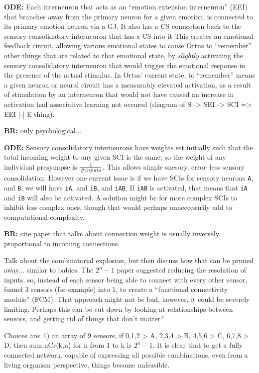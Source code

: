 \documentclass[letterpaper]{article}
\begin{document}
\textbf{ODE:} Each interneuron that acts as an ``emotion extension interneuron'' (EEI) that branches away from the primary neuron for a given emotion, is connected to its primary emotion neuron via a GJ.
It also has a CS connection back to the sensory consolidatory interneuron that has a CS into it
This creates an emotional feedback circuit, allowing various emotional states to cause Ortus to ``remember'' other things that are related to that emotional state, by \textit{slightly} activating the sensory consolidatory interneuron that would trigger the emotional response in the presence of the actual stimulus. In Ortus' current state, to ``remember'' means a given neuron or neural circuit has a measurably elevated activation, as a result of stimulation by an interneuron that would not have caused an increase in activation  had associative learning not occured (diagram of S -> SEI -> SCI => EEI |-| E thing).

\textbf{BR:} only psychological...

\textbf{ODE:} Sensory consolidatory interneurons have weights set initially such that the total incoming weight to any given SCI is the same; so the weight of any individual presynapse is $ 1 \over {\#inputs}$. This allows simple snesory, error--less sensory consolidation. However one current issue is if we have SCIs for sensory neurons \texttt{A}, and \texttt{B}, we will have \texttt{iA}, and \texttt{iB}, and \texttt{iAB}. If \texttt{iAB} is activated, that means that \texttt{iA} and \texttt{iB} will also be activated. A solution might be for more complex SCIs to inhibit less complex ones, though that would perhaps unneccesarily add to computational complexity.

\textbf{BR:} cite paper that talks about connection weight is usually inversely proportional to incoming connections.

Talk about the combinatorial explosion, but then discuss how that can be pruned away... similar to babies. The $2^n - 1$ paper suggested reducing the resolution of inputs, so, instead of each sensor being able to connect with every other sensor, funnel 3 sensors (for example) into 1, to create a ``functional connectivity module'' (FCM). That approach might not be bad, however, it could be severely limiting. Perhaps this can be cut down by looking at relationships between sensors, and getting rid of things that don't matter?

Choices are:
1) an array of 9 sensors, if 0,1,2 > A, 2,3,4 > B, 4,5,6 > C, 6,7,8 > D, then sum {nCr(k,n)} for n from 1 to k is $2^n - 1$. It is clear that to get a fully connected network, capable of expressing all possible combinations, even from a living organism perspective, things become unfeasible.
\end{document}
